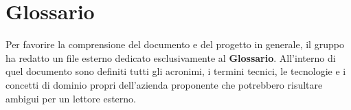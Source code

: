 \appendix
\section{Glossario}
Per favorire la comprensione del documento e del progetto in generale, il gruppo ha redatto un file esterno dedicato esclusivamente al \textbf{Glossario}. All'interno di quel documento sono definiti tutti gli acronimi, i termini tecnici, le tecnologie e i concetti di dominio propri dell'azienda proponente che potrebbero risultare ambigui per un lettore esterno.